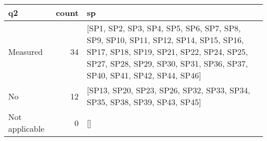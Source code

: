 \begin{tabular}{lrl}
\toprule
             q2 &  count &                                                                                                                                                                                                   sp \\
\midrule
       Measured &     34 &  [SP1, SP2, SP3, SP4, SP5, SP6, SP7, SP8, SP9, SP10, SP11, SP12, SP14, SP15, SP16, SP17, SP18, SP19, SP21, SP22, SP24, SP25, SP27, SP28, SP29, SP30, SP31, SP36, SP37, SP40, SP41, SP42, SP44, SP46] \\
             No &     12 &                                                                                                                             [SP13, SP20, SP23, SP26, SP32, SP33, SP34, SP35, SP38, SP39, SP43, SP45] \\
 Not applicable &      0 &                                                                                                                                                                                                   [] \\
\bottomrule
\end{tabular}

